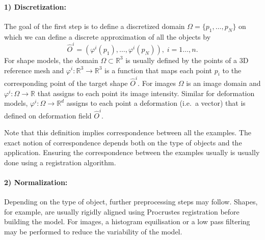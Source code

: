 \documentclass{InsightArticle}
\def\R{\mathds{R}} %
\begin{document}
\paragraph{1) Discretization:} The goal of the first step is to define a  discretized domain $\Omega = \{p_1, \ldots, p_N\}$  
on which we can define a discrete approximation of all the objects by 
\[
\hat{O}^i = (\varphi^i(p_1), \ldots, \varphi^i(p_N)), \; i  = 1 \dots, n. 
\]
For shape models, the domain $\Omega \subset \R^3$ is usually defined by the points of a 3D reference mesh and $\varphi^i : \R^3 \to \R^3$ is a function that maps each point $p_i$ to the corresponding point of the target shape $\hat{O}^i$. For images $\Omega$ is an image domain and $\varphi^i : \Omega \to \R$ that assigns to each point its image intensity. Similar for deformation models, $\varphi^i : \Omega \to \R^d$ assigns to each point a deformation (i.e.\ a vector) that is defined on deformation field $\hat{O}^i$. 

Note that this definition implies correspondence between all the examples. The
exact notion of correspondence depends both on the type of objects and the
application. Ensuring the correspondence between the examples usually is usually done using a registration algorithm.
\paragraph{2) Normalization:}
Depending on the type of object, further preprocessing steps may follow. Shapes, for example, are usually rigidly aligned using Procrustes registration before building the model. For images, a histogram equilisation or a low pass filtering may be performed to reduce the variability of the model.  
\end{document}
